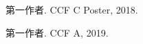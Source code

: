 
\begin{publications}{99}
    \item\textsc{第一作者}. {CCF C Poster}, 2018.  
    \item\textsc{第一作者}. {CCF A}, 2019.
\end{publications}
